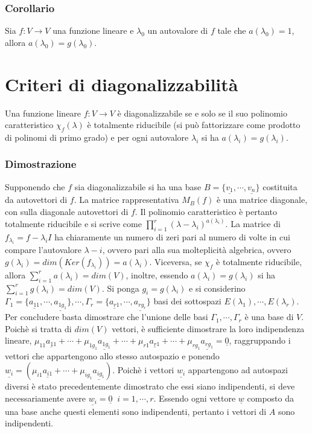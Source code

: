 \subsubsection{Corollario}
Sia $f:V\rightarrow V$ una funzione lineare e $\lambda_0$ un autovalore di $f$ tale che $a(\lambda_0)=1$, allora $a(\lambda_0)=g(\lambda_0)$.
\section{Criteri di diagonalizzabilit\`a}
Una funzione lineare $f:V\rightarrow V$ \`e diagonalizzabile se e solo se il suo polinomio caratteristico $\chi_f(\lambda)$ \`e totalmente riducibile (si pu\`o fattorizzare come
prodotto di polinomi di primo grado) e per ogni autovalore $\lambda_i$ si ha $a(\lambda_i)=g(\lambda_i)$.
\subsubsection{Dimostrazione}
Supponendo che $f$ sia diagonalizzabile si ha una base $B=\{\underline{v_1},\cdots,\underline{v_n}\}$ costituita da autovettori di $f$. La matrice rappresentativa $M_B(f)$ \`e 
una matrice diagonale, con sulla diagonale autovettori di $f$. Il polinomio caratteristico \`e pertanto totalmente riducibile e si scrive come $\prod\limits_{i=1}^r(\lambda-
\lambda_i)^{a(\lambda_i)}$. La matrice di $f_{\lambda_i}=f-\lambda_i I$ ha chiaramente un numero di zeri pari al numero di volte in cui compare l'autovalore $\lambda-i$, ovvero 
pari alla sua molteplicit\`a algebrica, ovvero $g(\lambda_i)=dim(Ker(f_{\lambda_i}))=a(\lambda_i)$. Viceversa, se $\chi_f$ \`e totalmente riducibile, allora $\sum\limits_{i=1}^r
a(\lambda_i)=dim(V)$, inoltre, essendo $a(\lambda_i)=g(\lambda_i)$ si ha $\sum\limits_{i=1}^rg(\lambda_i)=dim(V)$. Si ponga $g_i=g(\lambda_i)$ e si considerino $\Gamma_1=
\{\underline{a_{11}},\cdots,\underline{a_{1g_1}}\},\cdots,\Gamma_r=\{\underline{a_{r1}},\cdots,\underline{a_{rg_r}}\}$ basi dei sottospazi $E(\lambda_1),\cdots,E(\lambda_r)$. Per
concludere basta dimostrare che l'unione delle basi $\Gamma_1,\cdots,\Gamma_r$ \`e una base di $V$. Poich\`e si tratta di $dim(V)$ vettori, \`e sufficiente dimostrare la loro 
indipendenza lineare, $\mu_{11}\underline{a_{11}}+\cdots+\mu_{1g_1}\underline{a_{1g_1}}+\cdots+\mu_{r1}\underline{a_{r1}}+\cdots+\mu_{rg_1}\underline{a_{rg_1}}=\underline{0}$,
raggruppando i vettori che appartengono allo stesso autospazio e ponendo $\underline{w_i}=(\mu_{i1}\underline{a_{i1}}+\cdots+\mu_{ig_1}\underline{a_{ig_1}})$. Poich\`e i vettori 
$\underline{w_i}$ appartengono ad autospazi diversi \`e stato precedentemente dimostrato che essi siano indipendenti, si deve necessariamente avere $\underline{w_i}=\underline{0}
\;\;i=1,\cdots,r$. Essendo ogni vettore $\underline{w}$ composto da una base anche questi elementi sono indipendenti, pertanto i vettori di $A$ sono indipendenti.
